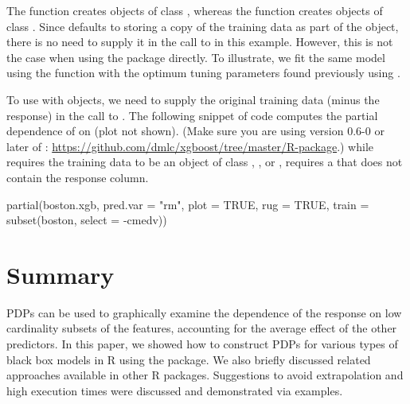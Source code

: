 The  function creates objects of class , whereas the  function creates objects of class . Since  defaults to storing a copy of the training data as part of the  object, there is no need to supply it in the call to  in this example. However, this is not the case when using the  package directly. To illustrate, we fit the same model using the  function with the optimum tuning parameters found previously using . %
To use  with  objects, we need to supply the original training data (minus the response) in the call to . The following snippet of code computes the partial dependence of  on  (plot not shown). (Make sure you are using version 0.6-0 or later of : \url{https://github.com/dmlc/xgboost/tree/master/R-package}.)  while  requires the training data to be an object of class , , or ,  requires a  that does not contain the response column.
\begin{example}
partial(boston.xgb, pred.var = "rm", plot = TRUE, rug = TRUE,
        train = subset(boston, select = -cmedv))
\end{example}


\section{Summary}

PDPs can be used to graphically examine the dependence of the response on low cardinality subsets of the features, accounting for the average effect of the other predictors. In this paper, we showed how to construct PDPs for various types of black box models in R using the  package. We also briefly discussed related approaches available in other R packages. Suggestions to avoid extrapolation and high execution times were discussed and demonstrated via examples.

